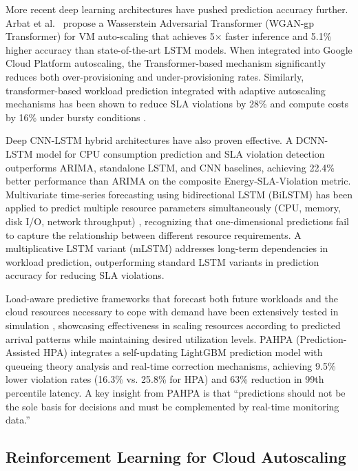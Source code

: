 More recent deep learning architectures have pushed prediction accuracy further. Arbat et al.~\cite{ArbatWassersteinTransformer22} propose a Wasserstein Adversarial Transformer (WGAN-gp Transformer) for VM auto-scaling that achieves 5× faster inference and 5.1\% higher accuracy than state-of-the-art LSTM models. When integrated into Google Cloud Platform autoscaling, the Transformer-based mechanism significantly reduces both over-provisioning and under-provisioning rates. Similarly, transformer-based workload prediction integrated with adaptive autoscaling mechanisms has been shown to reduce SLA violations by 28\% and compute costs by 16\% under bursty conditions \cite{TransformerAutoScaling26}.

Deep CNN-LSTM hybrid architectures have also proven effective. A DCNN-LSTM model \cite{DeepCNNLSTM24} for CPU consumption prediction and SLA violation detection outperforms ARIMA, standalone LSTM, and CNN baselines, achieving 22.4\% better performance than ARIMA on the composite Energy-SLA-Violation metric. Multivariate time-series forecasting using bidirectional LSTM (BiLSTM) has been applied to predict multiple resource parameters simultaneously (CPU, memory, disk I/O, network throughput) \cite{BiLSTMWorkload23}, recognizing that one-dimensional predictions fail to capture the relationship between different resource requirements. A multiplicative LSTM variant (mLSTM) \cite{mLSTMWorkload24} addresses long-term dependencies in workload prediction, outperforming standard LSTM variants in prediction accuracy for reducing SLA violations.

Load-aware predictive frameworks that forecast both future workloads and the cloud resources necessary to cope with demand have been extensively tested in simulation \cite{LoadAwarePredictive26}, showcasing effectiveness in scaling resources according to predicted arrival patterns while maintaining desired utilization levels. PAHPA (Prediction-Assisted HPA) \cite{PAHPA26} integrates a self-updating LightGBM prediction model with queueing theory analysis and real-time correction mechanisms, achieving 9.5\% lower violation rates (16.3\% vs. 25.8\% for HPA) and 63\% reduction in 99th percentile latency. A key insight from PAHPA is that ``predictions should not be the sole basis for decisions and must be complemented by real-time monitoring data.''

\subsection{Reinforcement Learning for Cloud Autoscaling}

